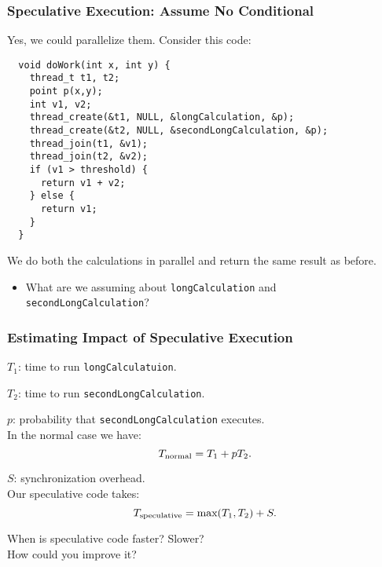 \begin{frame}[fragile]
  \frametitle{Speculative Execution: Assume No Conditional}

  
  Yes, we could parallelize them. Consider this code:
    
    \begin{lstlisting}
  void doWork(int x, int y) {
    thread_t t1, t2;
    point p(x,y);
    int v1, v2;
    thread_create(&t1, NULL, &longCalculation, &p);
    thread_create(&t2, NULL, &secondLongCalculation, &p);
    thread_join(t1, &v1);
    thread_join(t2, &v2);
    if (v1 > threshold) {
      return v1 + v2;
    } else {
      return v1;
    }
  }
    \end{lstlisting}

  We do both the calculations in parallel and return the same result as before.

  \begin{itemize}
    \item What are we assuming about {\tt longCalculation} and
{\tt secondLongCalculation}?
  \end{itemize}
  
\end{frame}

\begin{frame}
  \frametitle{Estimating Impact of Speculative Execution}

  
  $T_1$: time to run {\tt longCalculatuion}.

  $T_2$: time to run {\tt secondLongCalculation}.

  $p$: probability that {\tt secondLongCalculation} executes.\\[1em]

  In the normal case we have:
    \[T_{\mbox{\scriptsize normal}} = T_1 + pT_2.\]

  $S$: synchronization overhead.\\
  Our speculative code takes:
    \[ T_{\mbox{\scriptsize speculative}} = \mbox{max}(T_1, T_2) + S.\]

     When is speculative code faster? Slower? \\ How could you improve it?

  
\end{frame}

